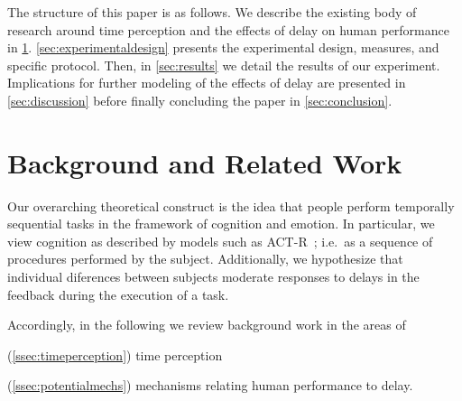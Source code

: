The structure of this paper is as follows.
We describe the existing body of research around time perception and the effects of delay on human performance in \cref{sec:background}.
\cref{sec:experimentaldesign} presents the experimental design, measures, and specific protocol.
Then, in \cref{sec:results} we detail the results of our experiment.
Implications for further modeling of the effects of delay are presented in \cref{sec:discussion} before finally concluding the paper in \cref{sec:conclusion}.

\section{Background and Related Work}\label{sec:background}




Our overarching theoretical construct is the idea that people perform temporally sequential tasks in the framework of cognition and emotion.
In particular, we view cognition as described by models such as {ACT-R}~\cite{neves1981knowledge}; i.e.\ as a sequence of procedures performed by the subject.
Additionally, we hypothesize that individual diferences between subjects moderate responses to delays in the feedback during the execution of a task. 

Accordingly, in the following we review background work in the areas of 
\begin{enumerate*}[label={}, before=\unskip{: }, itemjoin={{; }}, itemjoin*={{; and }}]
  \item[(\cref{ssec:timeperception})] time perception
  \item[(\cref{ssec:potentialmechs})] mechanisms relating human performance to delay.
\end{enumerate*}


